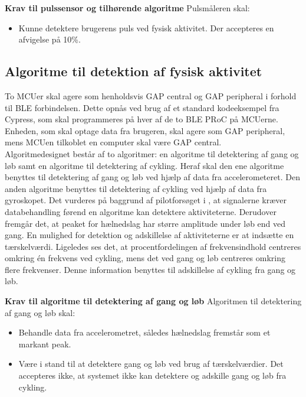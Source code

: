 \textbf{Krav til pulssensor og tilhørende algoritme} \newline
Pulsmåleren skal:
\begin{itemize}
\item Kunne detektere brugerens puls ved fysisk aktivitet. Der accepteres en afvigelse på 10\%.
\end{itemize}

\subsection{Algoritme til detektion af fysisk aktivitet} \label{krav_algoritme}
To MCUer skal agere som henholdsvis GAP central og GAP peripheral i forhold til BLE forbindelsen. Dette opnås ved brug af et standard kodeeksempel fra Cypress, som skal programmeres på hver af de to BLE PRoC på MCUerne. Enheden, som skal optage data fra brugeren, skal agere som GAP peripheral, mens MCUen tilkoblet en computer skal være GAP central. \\
Algoritmedesignet består af to algoritmer: en algoritme til detektering af gang og løb samt en algoritme til detektering af cykling. Heraf skal den ene algoritme benyttes til detektering af gang og løb ved hjælp af data fra accelerometeret. Den anden algoritme benyttes til detektering af cykling ved hjælp af data fra gyroskopet. Det vurderes på baggrund af pilotforsøget i , at signalerne kræver databehandling førend en algoritme kan detektere aktiviteterne. Derudover fremgår det, at peaket for hælnedslag har større amplitude under løb end ved gang. En mulighed for detektion og adskillelse af aktiviteterne er at indsætte en tærskelværdi. Ligeledes ses det, at procentfordelingen af frekvensindhold centreres omkring én frekvens ved cykling, mens det ved gang og løb centreres omkring flere frekvenser. Denne information benyttes til adskillelse af cykling fra gang og løb. 

\textbf{Krav til algoritme til detektering af gang og løb} \newline 
Algoritmen til detektering af gang og løb skal:
\begin{itemize}
	\item Behandle data fra accelerometret, således hælnedslag fremstår som et markant peak.
	\item Være i stand til at detektere gang og løb ved brug af tærskelværdier. Det accepteres ikke, at systemet ikke kan detektere og adskille gang og løb fra cykling.
\end{itemize}

